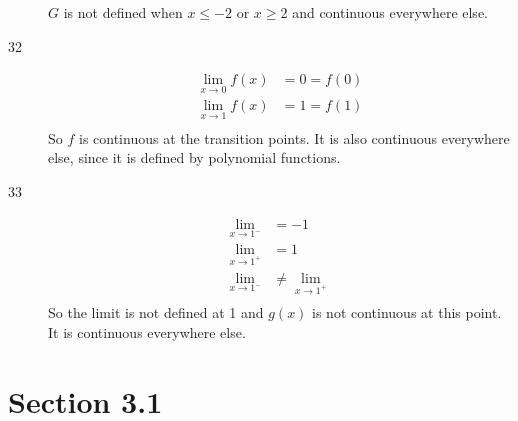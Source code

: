 \documentclass{exam}
\begin{document}
\begin{description}
$G$ is not defined when $x \leq -2 \text{ or } x \geq 2$ and continuous everywhere else.

\item[32]
\begin{align*}
  \lim_{x \to 0} f(x) &= 0 = f(0) \\
  \lim_{x \to 1} f(x) &= 1 = f(1) \\
\end{align*}
So $f$ is continuous at the transition points.  It is also continuous everywhere else, since it is defined by polynomial functions.

\item[33]
\begin{align*}
  \lim_{x \to 1^-} &= -1 \\
  \lim_{x \to 1^+} &= 1 \\
  \lim_{x \to 1^-} &\neq \lim_{x \to 1^+}  \\
\end{align*}
So the limit is not defined at 1 and $g(x)$ is not continuous at this point.  It is continuous everywhere else.

\end{description}

\section{Section 3.1}
\end{document}
